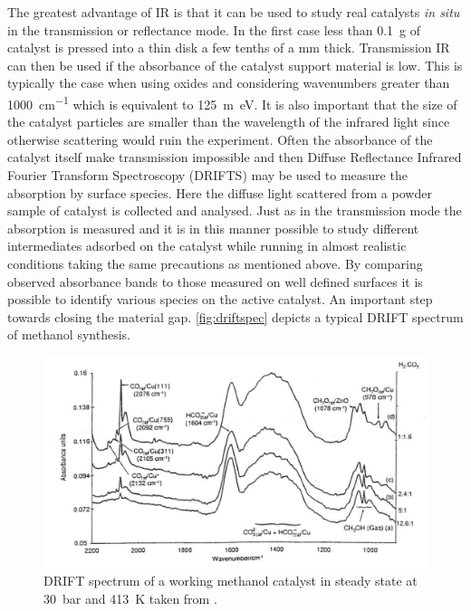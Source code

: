 The greatest advantage of IR is that it can be used to study real catalysts {\it in situ} in the transmission or reflectance mode. In the first case less than \SI{0.1}{g} of catalyst is  pressed into a thin disk a few tenths of a \si{mm} thick. Transmission IR can then be used if the absorbance of the catalyst support material is low. This is typically the case when using oxides and considering wavenumbers greater than \SI{1000}{cm^{-1}} which is equivalent to \SI{125}{m\electronvolt}. It is also important that the size of the catalyst particles are smaller than the wavelength of the infrared light since otherwise scattering would ruin the experiment. Often the absorbance of the catalyst itself make transmission impossible and then Diffuse Reflectance Infrared  Fourier Transform Spectroscopy (DRIFTS) may be used to measure the absorption by surface species. Here the diffuse light scattered from a powder sample of catalyst is collected and analysed. Just as in the transmission mode the absorption is measured and it is in this manner possible to study different intermediates adsorbed on the catalyst while running in almost realistic conditions taking the same precautions as mentioned above. By comparing observed absorbance bands to those measured on well defined surfaces it is possible to identify various species on the active catalyst. An important step towards closing the material gap. \autoref{fig:driftspec} depicts a typical DRIFT spectrum of  methanol synthesis.

\begin{figure}[h!]
	\begin{center}
	\includegraphics[scale=4]{figures/08_08.png}
	\caption{DRIFT spectrum of a working methanol catalyst  in steady state at \SI{30}{bar} and \SI{413}{K} taken from \cite{Bailey}.}
	\label{fig:driftspec}
	\end{center}
\end{figure}